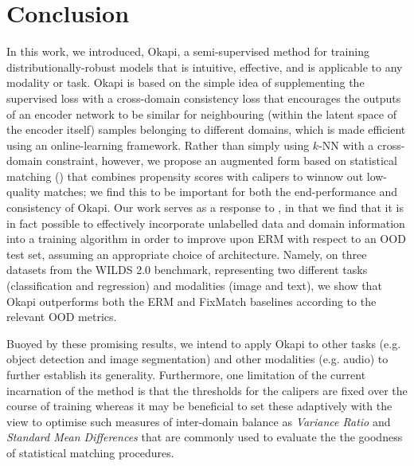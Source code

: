 \section{Conclusion}\label{sec:okapi-conclusion}
In this work, we introduced, Okapi, a semi-supervised method for training distributionally-robust
models that is intuitive, effective, and is applicable to any modality or task.
%
Okapi is based on the simple idea of supplementing the supervised loss with a cross-domain
consistency loss that encourages the outputs of an encoder network to be similar for neighbouring
(within the latent space of the encoder itself) samples  belonging to different domains, which is
made efficient using an online-learning framework.
%
Rather than simply using $k$-NN with a cross-domain constraint, however, we propose an augmented
form based on statistical matching (\CNN) that combines propensity scores with calipers to winnow
out low-quality matches; we find this to be important for both the end-performance and consistency
of Okapi.
%
Our work serves as a response to \cite{SagWeiLeeGaoetal22}, in that we find that it is in fact
possible to effectively incorporate unlabelled data and domain information into a training
algorithm in order to improve upon ERM with respect to an \ac{OOD} test set, assuming an
appropriate choice of architecture.
%
Namely, on three datasets from the WILDS 2.0 benchmark, representing two different tasks
(classification and regression) and modalities (image and text), we show that Okapi outperforms
both the ERM and FixMatch baselines according to the relevant \ac{OOD} metrics.
%

Buoyed by these promising results, we intend to apply Okapi to other tasks (e.g. object detection
and image segmentation) and other modalities (e.g. audio) to further establish its generality.
%
Furthermore, one limitation of the current incarnation of the method is that the thresholds for the
calipers are fixed over the course of training whereas it may be beneficial to set these adaptively
with the view to optimise such measures of inter-domain balance as \emph{Variance Ratio} and
\emph{Standard Mean Differences} that are commonly used to evaluate the the goodness of statistical
matching procedures.
